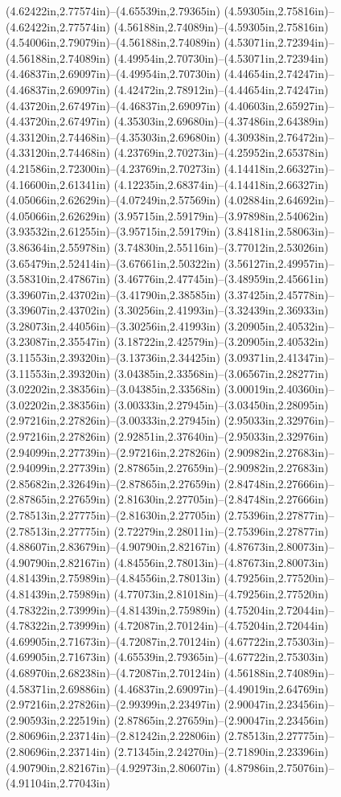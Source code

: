 (4.62422in,2.77574in)--(4.65539in,2.79365in) (4.59305in,2.75816in)--(4.62422in,2.77574in) (4.56188in,2.74089in)--(4.59305in,2.75816in) (4.54006in,2.79079in)--(4.56188in,2.74089in) (4.53071in,2.72394in)--(4.56188in,2.74089in) (4.49954in,2.70730in)--(4.53071in,2.72394in) (4.46837in,2.69097in)--(4.49954in,2.70730in) (4.44654in,2.74247in)--(4.46837in,2.69097in) (4.42472in,2.78912in)--(4.44654in,2.74247in) (4.43720in,2.67497in)--(4.46837in,2.69097in) (4.40603in,2.65927in)--(4.43720in,2.67497in) (4.35303in,2.69680in)--(4.37486in,2.64389in) (4.33120in,2.74468in)--(4.35303in,2.69680in) (4.30938in,2.76472in)--(4.33120in,2.74468in) (4.23769in,2.70273in)--(4.25952in,2.65378in) (4.21586in,2.72300in)--(4.23769in,2.70273in) (4.14418in,2.66327in)--(4.16600in,2.61341in) (4.12235in,2.68374in)--(4.14418in,2.66327in) (4.05066in,2.62629in)--(4.07249in,2.57569in) (4.02884in,2.64692in)--(4.05066in,2.62629in) (3.95715in,2.59179in)--(3.97898in,2.54062in) (3.93532in,2.61255in)--(3.95715in,2.59179in) (3.84181in,2.58063in)--(3.86364in,2.55978in) (3.74830in,2.55116in)--(3.77012in,2.53026in) (3.65479in,2.52414in)--(3.67661in,2.50322in) (3.56127in,2.49957in)--(3.58310in,2.47867in) (3.46776in,2.47745in)--(3.48959in,2.45661in) (3.39607in,2.43702in)--(3.41790in,2.38585in) (3.37425in,2.45778in)--(3.39607in,2.43702in) (3.30256in,2.41993in)--(3.32439in,2.36933in) (3.28073in,2.44056in)--(3.30256in,2.41993in) (3.20905in,2.40532in)--(3.23087in,2.35547in) (3.18722in,2.42579in)--(3.20905in,2.40532in) (3.11553in,2.39320in)--(3.13736in,2.34425in) (3.09371in,2.41347in)--(3.11553in,2.39320in) (3.04385in,2.33568in)--(3.06567in,2.28277in) (3.02202in,2.38356in)--(3.04385in,2.33568in) (3.00019in,2.40360in)--(3.02202in,2.38356in) (3.00333in,2.27945in)--(3.03450in,2.28095in) (2.97216in,2.27826in)--(3.00333in,2.27945in) (2.95033in,2.32976in)--(2.97216in,2.27826in) (2.92851in,2.37640in)--(2.95033in,2.32976in) (2.94099in,2.27739in)--(2.97216in,2.27826in) (2.90982in,2.27683in)--(2.94099in,2.27739in) (2.87865in,2.27659in)--(2.90982in,2.27683in) (2.85682in,2.32649in)--(2.87865in,2.27659in) (2.84748in,2.27666in)--(2.87865in,2.27659in) (2.81630in,2.27705in)--(2.84748in,2.27666in) (2.78513in,2.27775in)--(2.81630in,2.27705in) (2.75396in,2.27877in)--(2.78513in,2.27775in) (2.72279in,2.28011in)--(2.75396in,2.27877in) (4.88607in,2.83679in)--(4.90790in,2.82167in) (4.87673in,2.80073in)--(4.90790in,2.82167in) (4.84556in,2.78013in)--(4.87673in,2.80073in) (4.81439in,2.75989in)--(4.84556in,2.78013in) (4.79256in,2.77520in)--(4.81439in,2.75989in) (4.77073in,2.81018in)--(4.79256in,2.77520in) (4.78322in,2.73999in)--(4.81439in,2.75989in) (4.75204in,2.72044in)--(4.78322in,2.73999in) (4.72087in,2.70124in)--(4.75204in,2.72044in) (4.69905in,2.71673in)--(4.72087in,2.70124in) (4.67722in,2.75303in)--(4.69905in,2.71673in) (4.65539in,2.79365in)--(4.67722in,2.75303in) (4.68970in,2.68238in)--(4.72087in,2.70124in) (4.56188in,2.74089in)--(4.58371in,2.69886in) (4.46837in,2.69097in)--(4.49019in,2.64769in) (2.97216in,2.27826in)--(2.99399in,2.23497in) (2.90047in,2.23456in)--(2.90593in,2.22519in) (2.87865in,2.27659in)--(2.90047in,2.23456in) (2.80696in,2.23714in)--(2.81242in,2.22806in) (2.78513in,2.27775in)--(2.80696in,2.23714in) (2.71345in,2.24270in)--(2.71890in,2.23396in) (4.90790in,2.82167in)--(4.92973in,2.80607in) (4.87986in,2.75076in)--(4.91104in,2.77043in) 